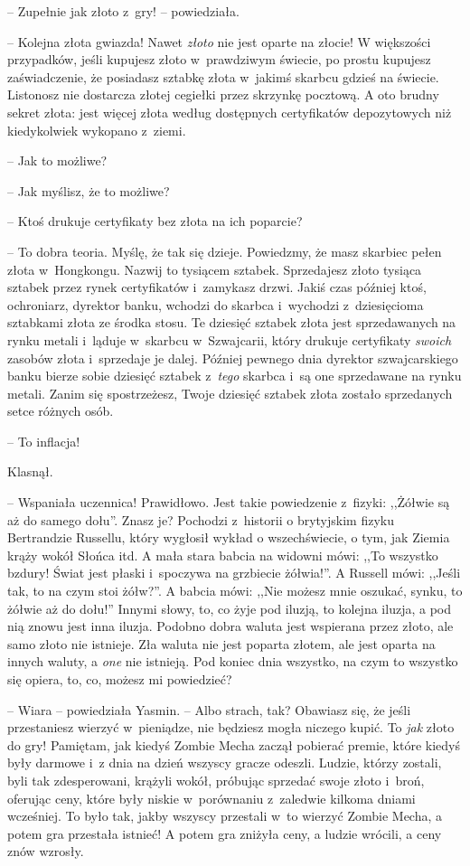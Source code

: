 \documentclass[oneside,polish,11pt,rmheadings]{mwbk}
\begin{document}
-- Zupełnie jak złoto z~gry! -- powiedziała.

-- Kolejna złota gwiazda! Nawet \textit{złoto }nie jest oparte na złocie! W większości przypadków, jeśli kupujesz złoto w~prawdziwym świecie, po prostu kupujesz zaświadczenie, że posiadasz sztabkę złota w~jakimś skarbcu gdzieś na świecie. Listonosz nie dostarcza złotej cegiełki przez skrzynkę pocztową. A oto brudny sekret złota: jest więcej złota według dostępnych certyfikatów depozytowych niż kiedykolwiek wykopano z~ziemi.

-- Jak to możliwe? 

-- Jak myślisz, że to możliwe? 

-- Ktoś drukuje certyfikaty bez złota na ich poparcie?

-- To dobra teoria. Myślę, że tak się dzieje. Powiedzmy, że masz skarbiec pełen złota w~Hongkongu. Nazwij to tysiącem sztabek. Sprzedajesz złoto tysiąca sztabek przez rynek certyfikatów i~zamykasz drzwi. Jakiś czas później ktoś, ochroniarz, dyrektor banku, wchodzi do skarbca i~wychodzi z~dziesięcioma sztabkami złota ze środka stosu. Te dziesięć sztabek złota jest sprzedawanych na rynku metali i~ląduje w~skarbcu w~Szwajcarii, który drukuje certyfikaty \textit{swoich }zasobów złota i~sprzedaje je dalej. Później pewnego dnia dyrektor szwajcarskiego banku bierze sobie dziesięć sztabek z~\textit{tego }skarbca i~są one sprzedawane na rynku metali. Zanim się spostrzeżesz, Twoje dziesięć sztabek złota zostało sprzedanych setce różnych osób. 

-- To inflacja! 

Klasnął. 

-- Wspaniała uczennica! Prawidłowo. Jest takie powiedzenie z~fizyki: ,,Żółwie są aż do samego dołu''. Znasz je? Pochodzi z~historii o brytyjskim fizyku Bertrandzie Russellu, który wygłosił wykład o wszechświecie, o tym, jak Ziemia krąży wokół Słońca itd. A mała stara babcia na widowni mówi: ,,To wszystko bzdury! Świat jest płaski i~spoczywa na grzbiecie żółwia!''. A Russell mówi: ,,Jeśli tak, to na czym stoi żółw?''. A babcia mówi: ,,Nie możesz mnie oszukać, synku, to żółwie aż do dołu!'' Innymi słowy, to, co żyje pod iluzją, to kolejna iluzja, a pod nią znowu jest inna iluzja. Podobno dobra waluta jest wspierana przez złoto, ale samo złoto nie istnieje. Zła waluta nie jest poparta złotem, ale jest oparta na innych waluty, a \textit{one }nie istnieją. Pod koniec dnia wszystko, na czym to wszystko się opiera, to, co, możesz mi powiedzieć?

-- Wiara -- powiedziała Yasmin. -- Albo strach, tak? Obawiasz się, że jeśli przestaniesz wierzyć w~pieniądze, nie będziesz mogła niczego kupić. To \textit{jak }złoto do gry! Pamiętam, jak kiedyś Zombie Mecha zaczął pobierać premie, które kiedyś były darmowe i~z dnia na dzień wszyscy gracze odeszli. Ludzie, którzy zostali, byli tak zdesperowani, krążyli wokół, próbując sprzedać swoje złoto i~broń, oferując ceny, które były niskie w~porównaniu z~zaledwie kilkoma dniami wcześniej. To było tak, jakby wszyscy przestali w~to wierzyć Zombie Mecha, a potem gra przestała istnieć! A potem gra zniżyła ceny, a ludzie wrócili, a ceny znów wzrosły.
\end{document}
